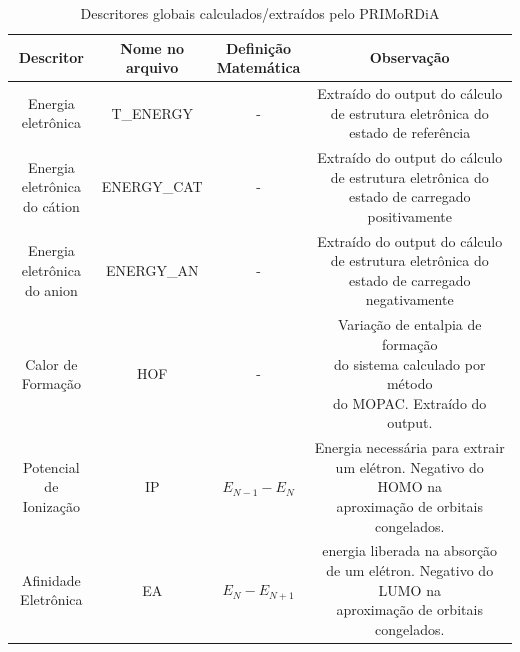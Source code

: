 \documentclass[a4paper,11pt]{refart}
\begin{document}
\hspace*{-\leftmarginwidth}
\begin{minipage}{\fullwidth}
\begin{table}[H]
\centering	
\caption{Descritores globais calculados/extraídos pelo PRIMoRDiA}
\begin{tabular}{c|c|c|c}
	\toprule
	Descritor &\makecell{Nome no\\ arquivo}&\makecell{Definição\\Matemática}&Observação \\
	\midrule
	\makecell{Energia \\eletrônica} & T\_ENERGY&-&\makecell{Extraído do output do cálculo\\ de estrutura eletrônica do \\estado de referência}\\\hline
	\makecell{Energia \\eletrônica\\do cátion} &ENERGY\_CAT &-& \makecell{Extraído do output do cálculo\\ de estrutura eletrônica do \\estado de carregado positivamente}\\\hline
	\makecell{Energia \\eletrônica\\do anion} &ENERGY\_AN &-&\makecell{Extraído do output do cálculo\\ de estrutura eletrônica do \\estado de carregado negativamente}\\\hline
	\makecell{Calor de\\Formação} & HOF&-&\makecell{Variação de entalpia de formação\\ do sistema calculado por método\\ do MOPAC. Extraído do output.} \\\hline
	\makecell{Potencial \\de Ionização} & IP & $E_{N-1}-E_{N}$ & \makecell{Energia necessária para extrair \\um elétron. Negativo do HOMO na \\aproximação de orbitais congelados.}  \\  \hline	
	\makecell{Afinidade \\Eletrônica}& EA & $E_{N}-E_{N+1}$ & \makecell{energia liberada na absorção \\de um elétron. Negativo do LUMO na \\aproximação de orbitais congelados.}   \\ \hline	

\end{tabular}
\end{table}
\end{minipage}
\end{document}
